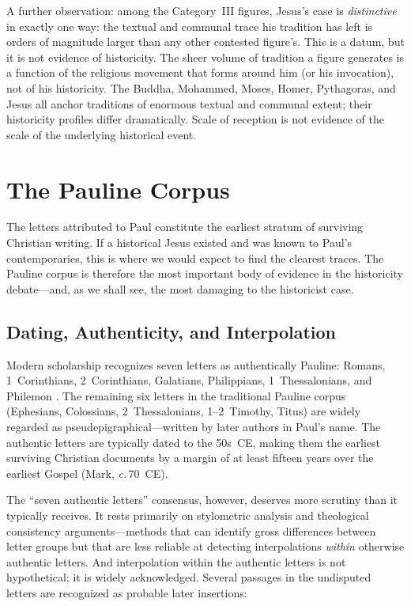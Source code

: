 \documentclass[12pt,oneside]{article}
\newcommand{\circa}{\textit{c.}\,}
\begin{document}
A further observation: among the Category~III figures, Jesus's case
is \textit{distinctive} in exactly one way: the textual and
communal trace his tradition has left is orders of magnitude
larger than any other contested figure's.  This is a datum, but it
is not evidence of historicity.  The sheer volume of tradition a
figure generates is a function of the religious movement that
forms around him (or his invocation), not of his historicity.  The
Buddha, Mohammed, Moses, Homer, Pythagoras, and Jesus all anchor
traditions of enormous textual and communal extent; their
historicity profiles differ dramatically.  Scale of reception is
not evidence of the scale of the underlying historical event.

\section{The Pauline Corpus}
\label{sec:paul}

The letters attributed to Paul constitute the earliest stratum of
surviving Christian writing.  If a historical Jesus existed and was known
to Paul's contemporaries, this is where we would expect to find the
clearest traces.  The Pauline corpus is therefore the most important
body of evidence in the historicity debate---and, as we shall see, the
most damaging to the historicist case.

\subsection{Dating, Authenticity, and Interpolation}
\label{sec:paul:dating}

Modern scholarship recognizes seven letters as authentically Pauline:
Romans, 1~Corinthians, 2~Corinthians, Galatians, Philippians,
1~Thessalonians, and Philemon \citep{Ehrman2004}.  The remaining six
letters in the traditional Pauline corpus (Ephesians, Colossians,
2~Thessalonians, 1--2~Timothy, Titus) are widely regarded as
pseudepigraphical---written by later authors in Paul's name.  The
authentic letters are typically dated to the 50s~CE, making them the
earliest surviving Christian documents by a margin of at least fifteen
years over the earliest Gospel (Mark, \circa 70~CE).

The ``seven authentic letters'' consensus, however, deserves more
scrutiny than it typically receives.  It rests primarily on stylometric
analysis and theological consistency arguments---methods that can
identify gross differences between letter groups but that are less
reliable at detecting interpolations \textit{within} otherwise authentic
letters.  And interpolation within the authentic letters is not
hypothetical; it is widely acknowledged.  Several passages in the
undisputed letters are recognized as probable later insertions:
\end{document}
